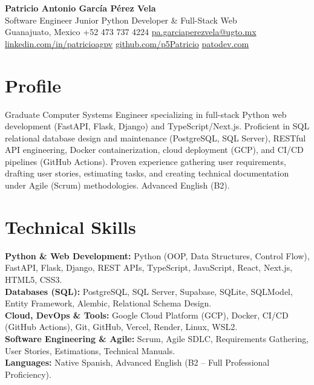 \documentclass[10pt,letterpaper]{article}
\begin{document}
\pagestyle{empty}
\sffamily

\begin{center}
  {\LARGE\bfseries\color{headingcolor} Patricio Antonio García Pérez Vela}\\[0.18em]
  {\small Software Engineer \textbar{} Junior Python Developer \& Full-Stack Web}\\[0.28em]
  {\footnotesize Guanajuato, Mexico \textbar{} +52 473 737 4224 \textbar{} \href{mailto:pa.garciaperezvela@ugto.mx}{pa.garciaperezvela@ugto.mx}}\\[0.12em]
  {\footnotesize \href{https://linkedin.com/in/patricioagpv}{linkedin.com/in/patricioagpv} \textbar{} \href{https://github.com/p5Patricio}{github.com/p5Patricio} \textbar{} \href{https://patodev.com/}{patodev.com}}
\end{center}

\vspace{0.05em}

\section{Profile}
{\small Graduate Computer Systems Engineer specializing in full-stack Python web development (FastAPI, Flask, Django) and TypeScript/Next.js. Proficient in SQL relational database design and maintenance (PostgreSQL, SQL Server), RESTful API engineering, Docker containerization, cloud deployment (GCP), and CI/CD pipelines (GitHub Actions). Proven experience gathering user requirements, drafting user stories, estimating tasks, and creating technical documentation under Agile (Scrum) methodologies. Advanced English (B2).}

\section{Technical Skills}
{\small
\textbf{Python \& Web Development:} Python (OOP, Data Structures, Control Flow), FastAPI, Flask, Django, REST APIs, TypeScript, JavaScript, React, Next.js, HTML5, CSS3.\\[0.04em]
\textbf{Databases (SQL):} PostgreSQL, SQL Server, Supabase, SQLite, SQLModel, Entity Framework, Alembic, Relational Schema Design.\\[0.04em]
\textbf{Cloud, DevOps \& Tools:} Google Cloud Platform (GCP), Docker, CI/CD (GitHub Actions), Git, GitHub, Vercel, Render, Linux, WSL2.\\[0.04em]
\textbf{Software Engineering \& Agile:} Scrum, Agile SDLC, Requirements Gathering, User Stories, Estimations, Technical Manuals.\\[0.04em]
\textbf{Languages:} Native Spanish, Advanced English (B2 -- Full Professional Proficiency).
}
\end{document}
